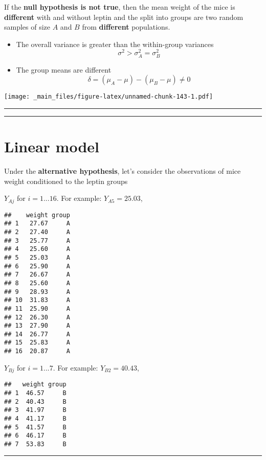 \documentclass[
]{book}
\begin{document}
If the \textbf{null hypothesis is not true}, then the mean weight of the mice is \textbf{different} with and without leptin and the split into groups are two random samples of size \(A\) and \(B\) from \textbf{different} populations.

\begin{itemize}
\item
  The overall variance is greater than the within-group variances \[\sigma^2> \sigma^2_A=\sigma^2_B\]
\item
  The group means are different \[\delta=(\mu_A-\mu)-(\mu_B-\mu)\neq 0\]
\end{itemize}

\texttt{[image: \_main\_files/figure-latex/unnamed-chunk-143-1.pdf]}

\begin{center}\rule{0.5\linewidth}{0.5pt}\end{center}

\begin{center}\rule{0.5\linewidth}{0.5pt}\end{center}

\hypertarget{linear-model}{%
\section{Linear model}\label{linear-model}}

Under the \textbf{alternative hypothesis}, let's consider the observations of mice weight conditioned to the leptin groups

\(Y_{Aj}\) for \(i=1...16\). For example: \(Y_{A5}=25.03\),

\begin{verbatim}
##    weight group
## 1   27.67     A
## 2   27.40     A
## 3   25.77     A
## 4   25.60     A
## 5   25.03     A
## 6   25.90     A
## 7   26.67     A
## 8   25.60     A
## 9   28.93     A
## 10  31.83     A
## 11  25.90     A
## 12  26.30     A
## 13  27.90     A
## 14  26.77     A
## 15  25.83     A
## 16  20.87     A
\end{verbatim}

\(Y_{Bj}\) for \(i=1...7\). For example: \(Y_{B2}=40.43\),

\begin{verbatim}
##   weight group
## 1  46.57     B
## 2  40.43     B
## 3  41.97     B
## 4  41.17     B
## 5  41.57     B
## 6  46.17     B
## 7  53.83     B
\end{verbatim}

\begin{center}\rule{0.5\linewidth}{0.5pt}\end{center}
\end{document}
